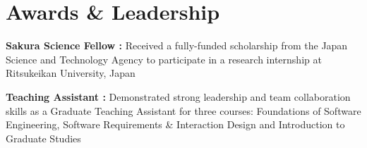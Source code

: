 \documentclass[letterpaper]{article}
\makeatletter
\newcommand{\resumeItemWithoutTitle}[1]{
  \item\small{
    {#1 \vspace{-2pt}}
  }
}
\newcommand{\shortSection}[1]{
    \vspace{-6pt}
    \section{#1}
}
\newcommand{\projectHeading}[3]{
  \begin{tabular*}{\textwidth}{l@{\extracolsep{\fill}}r}
        \textbf{#1} 
        \hspace{-2pt} $\vert$ \hspace{-2pt} \small{\textit{#2}} 
        & 
        \textit{#3} \\
    \end{tabular*}\vspace{-2pt}
}
\newcommand*{\skill}[2]{
  \textbf{#1 : }#2 \\
  \vspace{1pt}
}
\newcommand{\resumeItemListStart}{\begin{itemize}}
\newcommand{\resumeItemListEnd}{\end{itemize}}
\makeatother
\begin{document}


\shortSection{Awards \& Leadership}
\skill{Sakura Science Fellow}{Received a fully-funded scholarship from the Japan Science and Technology Agency to participate in a research internship at Ritsukeikan University, Japan}
\skill{Teaching Assistant}{Demonstrated strong leadership and team collaboration skills as a Graduate Teaching Assistant for three courses: Foundations of Software Engineering, Software Requirements \& Interaction Design and Introduction to Graduate Studies}
\end{document}
